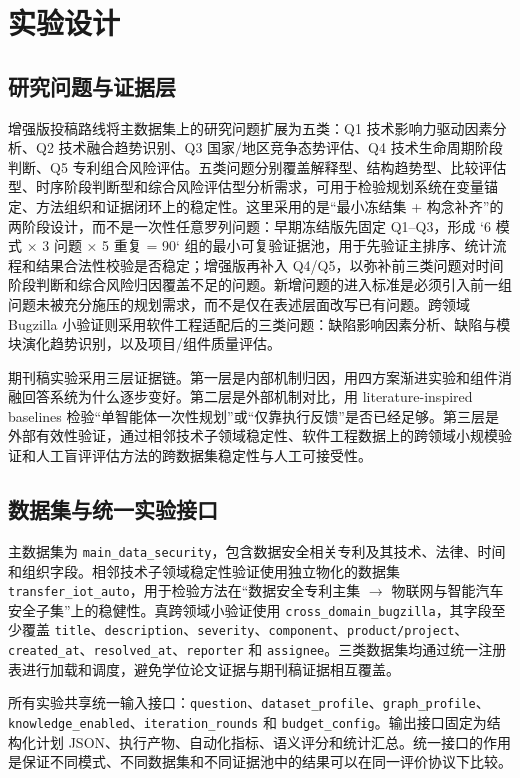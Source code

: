 \section{实验设计}

\subsection{研究问题与证据层}

增强版投稿路线将主数据集上的研究问题扩展为五类：Q1 技术影响力驱动因素分析、Q2 技术融合趋势识别、Q3 国家/地区竞争态势评估、Q4 技术生命周期阶段判断、Q5 专利组合风险评估。五类问题分别覆盖解释型、结构趋势型、比较评估型、时序阶段判断型和综合风险评估型分析需求，可用于检验规划系统在变量锚定、方法组织和证据闭环上的稳定性。这里采用的是“最小冻结集 + 构念补齐”的两阶段设计，而不是一次性任意罗列问题：早期冻结版先固定 Q1--Q3，形成 `6 模式 × 3 问题 × 5 重复 = 90` 组的最小可复验证据池，用于先验证主排序、统计流程和结果合法性校验是否稳定；增强版再补入 Q4/Q5，以弥补前三类问题对时间阶段判断和综合风险归因覆盖不足的问题。新增问题的进入标准是必须引入前一组问题未被充分施压的规划需求，而不是仅在表述层面改写已有问题。跨领域 Bugzilla 小验证则采用软件工程适配后的三类问题：缺陷影响因素分析、缺陷与模块演化趋势识别，以及项目/组件质量评估。

期刊稿实验采用三层证据链。第一层是内部机制归因，用四方案渐进实验和组件消融回答系统为什么逐步变好。第二层是外部机制对比，用 literature-inspired baselines 检验“单智能体一次性规划”或“仅靠执行反馈”是否已经足够。第三层是外部有效性验证，通过相邻技术子领域稳定性、软件工程数据上的跨领域小规模验证和人工盲评评估方法的跨数据集稳定性与人工可接受性。

\subsection{数据集与统一实验接口}

主数据集为 \texttt{main\_data\_security}，包含数据安全相关专利及其技术、法律、时间和组织字段。相邻技术子领域稳定性验证使用独立物化的数据集 \texttt{transfer\_iot\_auto}，用于检验方法在“数据安全专利主集 $\rightarrow$ 物联网与智能汽车安全子集”上的稳健性。真跨领域小验证使用 \texttt{cross\_domain\_bugzilla}，其字段至少覆盖 \texttt{title}、\texttt{description}、\texttt{severity}、\texttt{component}、\texttt{product/project}、\texttt{created\_at}、\texttt{resolved\_at}、\texttt{reporter} 和 \texttt{assignee}。三类数据集均通过统一注册表进行加载和调度，避免学位论文证据与期刊稿证据相互覆盖。

所有实验共享统一输入接口：\texttt{question}、\texttt{dataset\_profile}、\texttt{graph\_profile}、\texttt{knowledge\_enabled}、\texttt{iteration\_rounds} 和 \texttt{budget\_config}。输出接口固定为结构化计划 JSON、执行产物、自动化指标、语义评分和统计汇总。统一接口的作用是保证不同模式、不同数据集和不同证据池中的结果可以在同一评价协议下比较。

